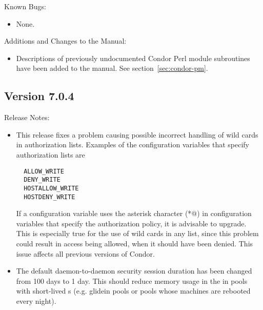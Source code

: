 \noindent Known Bugs:

\begin{itemize}

\item None.

\end{itemize}

\noindent Additions and Changes to the Manual:

\begin{itemize}

\item Descriptions of previously undocumented Condor Perl module subroutines
  have been added to the manual.  See section~\ref{sec:condor-pm}.

\end{itemize}



\subsection*{\label{sec:New-7-0-4}Version 7.0.4}

\noindent Release Notes:

\begin{itemize}

\item This release fixes a problem causing possible incorrect handling
of wild cards in authorization lists.
Examples of the configuration variables that specify
authorization lists are
\begin{verbatim}
  ALLOW_WRITE
  DENY_WRITE
  HOSTALLOW_WRITE
  HOSTDENY_WRITE
\end{verbatim}
If a configuration variable uses the asterisk character
(\verb@*@) in configuration variables that specify the
authorization policy, it is advisable to upgrade.
This is especially true for the 
use of wild cards in any  list,
since this problem could result in
access being allowed, when it should have been denied.
This issue affects all previous versions of Condor.

\item The default daemon-to-daemon security session duration has been
changed from 100 days to 1 day. This should reduce memory usage in the
 in pools with short-lived s (e.g. 
glidein pools or pools whose machines are rebooted every night).

\end{itemize}


